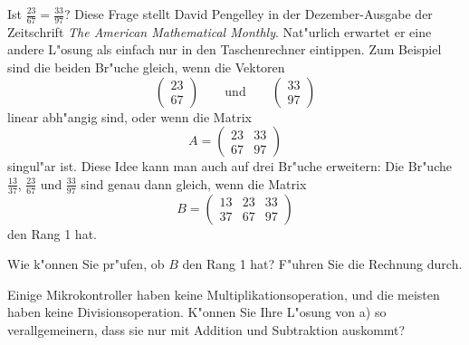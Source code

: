 Ist $\frac{23}{67}=\frac{33}{97}$? Diese Frage stellt David Pengelley
in der Dezember-Ausgabe der Zeitschrift {\it The American Mathematical
Monthly}. Nat"urlich erwartet er eine andere L"osung als einfach nur
in den Taschenrechner eintippen. Zum Beispiel sind die beiden Br"uche
gleich, wenn die Vektoren
\[
\begin{pmatrix}
23\\67
\end{pmatrix}
\qquad\text{und}\qquad
\begin{pmatrix}
33\\97
\end{pmatrix}
\]
linear abh"angig sind, oder wenn die Matrix
\[
A=
\begin{pmatrix}
23&33\\
67&97
\end{pmatrix}
\]
singul"ar ist. Diese Idee kann man auch auf drei Br"uche erweitern: Die
Br"uche $\frac{13}{37}$, $\frac{23}{67}$ und $\frac{33}{97}$ sind genau
dann gleich, wenn die Matrix
\[
B=\begin{pmatrix}
13&23&33\\
37&67&97
\end{pmatrix}
\]
den Rang 1 hat.

\begin{teilaufgaben}
\item Wie k"onnen Sie pr"ufen, ob $B$ den Rang 1 hat? F"uhren Sie die
Rechnung durch.
\item Einige Mikrokontroller haben keine Multiplikationsoperation, und
die meisten haben keine Divisionsoperation.
K"onnen Sie Ihre L"osung von a) so verallgemeinern, dass sie nur mit
Addition und Subtraktion auskommt?
\end{teilaufgaben}

